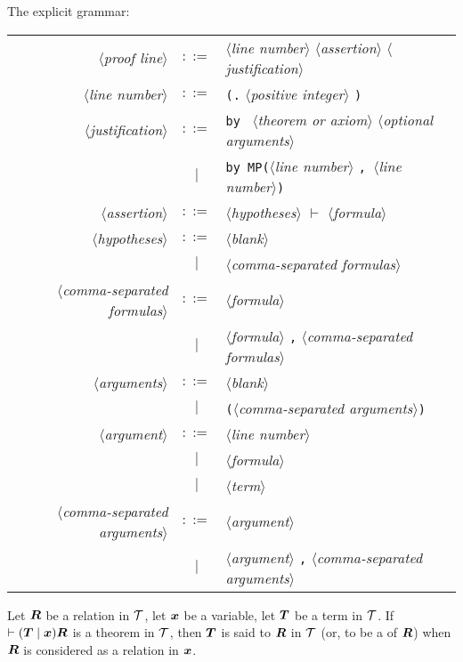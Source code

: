 The explicit grammar:
\begin{center}
\begin{tabular}{rcl}
$\langle$\textit{proof line\/}$\rangle$ & $::=$ & $\langle$\textit{line number\/}$\rangle$ 
$\langle$\textit{assertion\/}$\rangle$ $\langle$\textit{justification\/}$\rangle$\\
$\langle$\textit{line number}$\rangle$ & $::=$ & \texttt{(.} $\langle$\textit{positive integer\/}$\rangle$ \texttt{)}\\
$\langle$\textit{justification\/}$\rangle$
& $::=$ & \texttt{by } $\langle$\textit{theorem or axiom}$\rangle$ $\langle$\textit{optional arguments}$\rangle$\\
& $\mid$ & \texttt{by MP(}$\langle$\textit{line number\/}$\rangle$
\texttt{, }$\langle$\textit{line number\/}$\rangle$\texttt{)}\\
$\langle$\textit{assertion\/}$\rangle$ & $::=$ & $\langle$\textit{hypotheses}$\rangle$ $\vdash$ $\langle$\textit{formula}$\rangle$\\[3ex]
$\langle$\textit{hypotheses}$\rangle$ & $::=$ & $\langle$\textit{blank}$\rangle$\\
& $\mid$ & $\langle$\textit{comma-separated formulas}$\rangle$\\
$\langle$\textit{comma-separated formulas}$\rangle$
& $::=$ & $\langle$\textit{formula}$\rangle$\\
& $\mid$ & $\langle$\textit{formula}$\rangle$ \texttt{,} $\langle$\textit{comma-separated formulas}$\rangle$\\[3ex]
$\langle$\textit{arguments}$\rangle$ & $::=$ & $\langle$\textit{blank}$\rangle$\\
& $\mid$ & \texttt{(}$\langle$\textit{comma-separated arguments}$\rangle$\texttt{)}\\
$\langle$\textit{argument}$\rangle$ & $::=$ & $\langle$\textit{line number}$\rangle$\\
& $\mid$ &$\langle$\textit{formula}$\rangle$\\
& $\mid$ &$\langle$\textit{term}$\rangle$ \\
$\langle$\textit{comma-separated arguments}$\rangle$ & $::=$ &$\langle$\textit{argument}$\rangle$\\
& $\mid$ &$\langle$\textit{argument}$\rangle$ \texttt{,} $\langle$\textit{comma-separated arguments}$\rangle$\\
\end{tabular}
\end{center}

\begin{definition}
Let $\boldsymbol{R}$ be a relation in $\mathcal{T}$, let
$\boldsymbol{x}$ be a variable, let $\boldsymbol{T}$ be a term in
$\mathcal{T}$. If $\vdash(\boldsymbol{T}\mid\boldsymbol{x})\boldsymbol{R}$
is a theorem in $\mathcal{T}$, then $\boldsymbol{T}$ is said to
 $\boldsymbol{R}$ in $\mathcal{T}$ (or, to
be a  of $\boldsymbol{R}$) when $\boldsymbol{R}$ is
considered as a relation in $\boldsymbol{x}$.
\end{definition}

